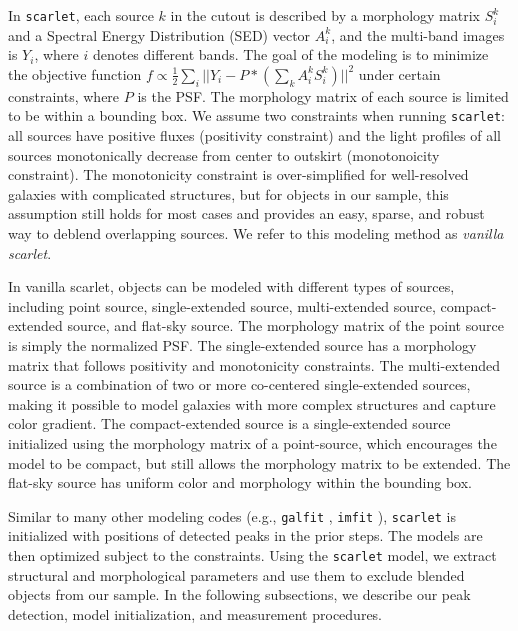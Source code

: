 \documentclass[twocolumn,astrosymb,twocolappendix]{aastex631}
\newcommand{\code}[1]{\texttt{#1}}
\begin{document}
\begin{CJK*}{UTF8}{gbsn}
In \code{scarlet}, each source $k$ in the cutout is described by a morphology matrix $S^k_i$ and a Spectral Energy Distribution (SED) vector $A^k_i$, and the multi-band images is $Y_i$, where $i$ denotes different bands. The goal of the modeling is to minimize the objective function $f \propto \frac{1}{2}\sum_i ||Y_i - P \ast (\sum_k A^k_i S^k_i)||^{2}$ under certain constraints, where $P$ is the PSF. The morphology matrix of each source is limited to be within a bounding box. We assume two constraints when running \code{scarlet}: all sources have positive fluxes (positivity constraint) and the light profiles of all sources monotonically decrease from center to outskirt (monotonoicity constraint). The monotonicity constraint is over-simplified for well-resolved galaxies with complicated structures, but for objects in our sample, this assumption still holds for most cases and provides an easy, sparse, and robust way to deblend overlapping sources. We refer to this modeling method as \textit{vanilla scarlet}. 

In vanilla scarlet, objects can be modeled with different types of sources, including point source, single-extended source, multi-extended source, compact-extended source, and flat-sky source. The morphology matrix of the point source is simply the normalized PSF. The single-extended source has a morphology matrix that follows positivity and monotonicity constraints. The multi-extended source is a combination of two or more co-centered single-extended sources, making it possible to model galaxies with more complex structures and capture color gradient. The compact-extended source is a single-extended source initialized using the morphology matrix of a point-source, which encourages the model to be compact, but still allows the morphology matrix to be extended. The flat-sky source has uniform color and morphology within the bounding box.

Similar to many other modeling codes (e.g., \code{galfit} \citealt{galfit}, \code{imfit} \citealt{imfit}), \code{scarlet} is initialized with positions of detected peaks in the prior steps. The models are then optimized subject to the constraints. Using the \code{scarlet} model, we extract structural and morphological parameters and use them to exclude blended objects from our sample. In the following subsections, we describe our peak detection, model initialization, and measurement procedures. 


\end{CJK*}
\end{document}
